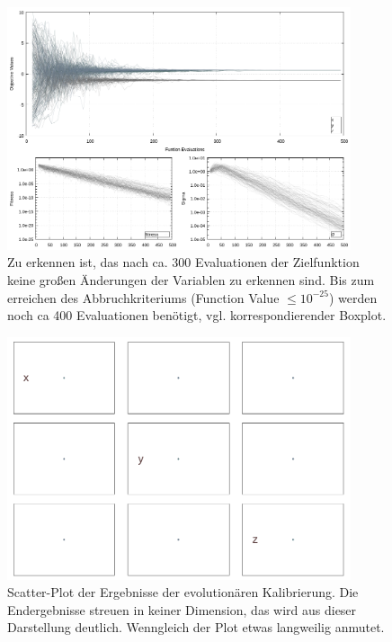 \begin{figure}[!ht]
  \begin{center}
  
    \caption[Linien-Plot der Endergebnisse der Kalibierung]{Zu erkennen ist, das nach ca. 300 Evaluationen der Zielfunktion keine großen Änderungen der Variablen zu erkennen sind. Bis zum erreichen des Abbruchkriteriums (Function Value $\leq10^{-25}$) werden noch ca 400 Evaluationen benötigt, vgl. korrespondierender Boxplot.}
    \label{fig:Final_Calibration_Ant0_ES-Lines}  
    \includegraphics[width=0.9\textwidth]{img/calibration/calibration_ant0-lines.png}
  \end{center}
%  
\end{figure}
%
\begin{figure}[!ht]
  \begin{center}
  
    \caption[Kalibierung Scatter-Plot]{Scatter-Plot der Ergebnisse der evolutionären Kalibrierung. Die Endergebnisse streuen in keiner Dimension, das wird aus dieser Darstellung deutlich. Wenngleich der Plot etwas langweilig anmutet.}
    \label{fig:Final_Calibration_Ant0_ES-Scatter}  
    \includegraphics[width=0.9\textwidth]{img/calibration/calibration_ant0-scatter.png}
  \end{center}
%  
\end{figure}
